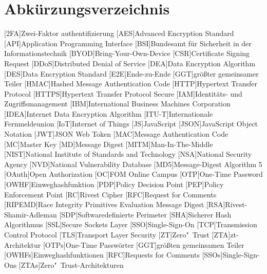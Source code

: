 \section*{Abkürzungsverzeichnis}


\begin{acronym}
[RIPEMD]
    \itemsep0pt %
    [2FA]{Zwei-Faktor \gls{authentifizierung}}
    [AES]{Advanced Encryption Standard}
    [API]{Application Programming Interface}
    [BSI]{Bundesamt für Sicherheit in der Informationstechnik}
    [BYOD]{Bring-Your-Own-Device}
    [CSR]{Certificate Signing Request}
    [DDoS]{Distributed Denial of Service}
    [DEA]{Data Encryption Algorithm}
    [DES]{Data Encryption Standard}
    [E2E]{Ende-zu-Ende}
    [GGT]{größter gemeinsamer Teiler}
    [HMAC]{Hashed Message Authentication Code}
    [HTTP]{Hypertext Transfer Protocol}
    [\acs{HTTP}S]{Hypertext Transfer Protocol Secure}
    [IAM]{Identitäts- und Zugriffsmanagement}
    [IBM]{International Business Machines Corporation}
    [IDEA]{Internet Data Encryption Algorithm}
    [ITU-T]{Internationale Fernmeldeunion}
    [IoT]{Internet of Things}
    [JS]{JavaScript}
    [JSON]{JavaScript Object Notation}
    [JWT]{JSON Web Token}
    [MAC]{Message Authentication Code}
    [MC]{Master Key}
    [MD]{Message Digest}
    [MITM]{Man-In-The-Middle}
    [NIST]{National Institute of Standards and Technology}
    [NSA]{National Security Agency}
    [NVD]{National Vulnerability Database}
    [MD5]{Message-Digest Algorithm 5}
    [OAuth]{Open Authorization}
    [OC]{FOM Online Campus}
    [OTP]{One-Time Password}
    [OWHF]{Einweghashfunktion}
    [PDP]{Policy Decision Point}
    [PEP]{Policy Enforcement Point}
    [RC]{Rivest Cipher}
    [RFC]{Request for Comments}
    [RIPEMD]{Race Integrity Primitives Evaluation Message Digest}
    [RSA]{Rivest-Shamir-Adleman}
    [SDP]{Softwaredefinierte Perimeter}
    [SHA]{Sicherer Hash Algorithmus}
    [SSL]{Secure Sockets Layer}
    [SSO]{Single-Sign-On}
    [TCP]{Transmission Control Protocol}
    [TLS]{Transport Layer Security}
    [ZT]{Zero"~Trust}
    [ZTA]{\acl{zt}-Architektur}
    [OTPs]{One-Time Passwörter}
    [GGT]{größten gemeinsamen Teiler}
    [OWHFs]{Einweghashfunktionen}
    [RFC]{Requests for Comments}
    [SSOs]{Single-Sign-Ons}
    [ZTAs]{Zero"~Trust-Architekturen}
\end{acronym}